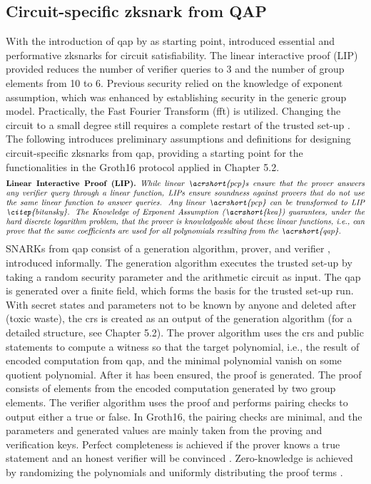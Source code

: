\subsection{Circuit-specific \acrshort{zksnark} from QAP}
With the introduction of \acrshort{qap} by \citet{GennaroLinPCP} as starting point, \citet{Groth2016OnTS} introduced essential and performative \acrshort{zksnark}s for circuit satisfiability. The linear interactive proof (LIP) provided reduces the number of verifier queries to 3 and the number of group elements from 10 to 6. Previous security relied on the knowledge of exponent assumption, which was enhanced by establishing security in the generic group model. Practically, the Fast Fourier Transform (\acrshort{fft}) is utilized. Changing the circuit to a small degree still requires a complete restart of the trusted set-up \citep{Thaler}. The following introduces preliminary assumptions and definitions for designing circuit-specific \acrshort{zksnark}s from \acrshort{qap}, providing a starting point for the functionalities in the Groth16 protocol applied in Chapter 5.2.
\begin{align*}
    \text{\parbox{450pt}{\textbf{Linear Interactive Proof (LIP).} \textit{While linear \acrshort{pcp}s ensure that the prover answers any verifier query through a linear function, LIPs ensure soundness against provers that do not use the same linear function to answer queries. Any linear \acrshort{pcp} can be transformed to LIP \citep{bitansky}. The Knowledge of Exponent Assumption (\acrshort{kea}) guarantees, under the hard discrete logarithm problem, that the prover is knowledgeable about these linear functions, i.e., can prove that the same coefficients are used for all polynomials resulting from the \acrshort{qap}.}}}
\end{align*}
SNARKs from \acrshort{qap} consist of a generation algorithm, prover, and verifier \citep{Groth2016OnTS, Guo, Benamara}, introduced informally.
The generation algorithm executes the trusted set-up by taking a random security parameter and the arithmetic circuit as input. The \acrshort{qap} is generated over a finite field, which forms the basis for the trusted set-up run. With secret states and parameters not to be known by anyone and deleted after (toxic waste), the \acrshort{crs} is created as an output of the generation algorithm (for a detailed structure, see Chapter 5.2). The prover algorithm uses the \acrshort{crs} and public statements to compute a witness so that the target polynomial, i.e., the result of encoded computation from \acrshort{qap}, and the minimal polynomial vanish on some quotient polynomial. After it has been ensured, the proof is generated. The proof consists of elements from the encoded computation generated by two group elements. The verifier algorithm uses the proof and performs pairing checks to output either a true or false. In Groth16, the pairing checks are minimal, and the parameters and generated values are mainly taken from the proving and verification keys. Perfect completeness is achieved if the prover knows a true statement and an honest verifier will be convinced \citep{Guo}. Zero-knowledge is achieved by randomizing the polynomials and uniformly distributing the proof terms \citep{Groth2016OnTS, Groth2010ShortPN}.

